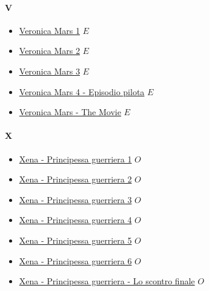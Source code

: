 	\paragraph{V} \hypertarget{SV}{}	
		\begin{itemize}
		
			\item \href{https://mega.nz/#F!h0xzjQQY!HF5rW8VjFddKlbV85LR5Yg} {Veronica Mars 1}  $E$ \\ 
			\item \href{https://mega.nz/#F!UxZl3KbQ!gHOo99pKktKo4-20Ym4Djw} {Veronica Mars 2}  $E$ \\ 
			\item \href{https://mega.nz/#F!5xBxxRbD!VHnMi9UjvSzCxnW9MX6Nzw} {Veronica Mars 3}  $E$ \\ 
			\item \href{https://mega.nz/#!EoZQVTxC!LJdq8idNVh443lA8si1ipOLa-zZ8GuZUdt5Qss3-SkE} {Veronica Mars 4 - Episodio pilota}  $E$ \\ 
			\item \href{https://mega.nz/#!FhIBVKpC!JjuePMFTE1-eFn8mc7C-sf3eRFCFvy4-M2_Ew1oAfFI} {Veronica Mars - The Movie}  $E$ \\ 
		
		
		\end{itemize}
	
	\paragraph{X} \hypertarget{SX}{}	
		\begin{itemize}
		
			\item \href{https://mega.nz/#F!174lSQrQ!-FZt2BBS2f_NYnM2O_TQHw} {Xena - Principessa guerriera 1}  $O$ \\ 
			\item \href{https://mega.nz/#F!oiJ3VK4Q!jM9H7Ba9I-Bn6dx-LhperA} {Xena - Principessa guerriera 2}  $O$ \\ 
			\item \href{https://mega.nz/#F!FuwTnZbK!Y4dKFIBfCj4cFfbGPnL04g} {Xena - Principessa guerriera 3}  $O$ \\ 
			\item \href{https://mega.nz/#F!Zuh3BBqQ!9kEZHQN7ew81UztjNQ3U7g} {Xena - Principessa guerriera 4}  $O$ \\ 
			\item \href{https://mega.nz/#F!Nigl0DxS!b4H8mVb0IYWbO03LTiu-Ng} {Xena - Principessa guerriera 5}  $O$ \\ 
			\item \href{https://mega.nz/#F!4rAAUJyZ!SgLb8fzDb32vNsAuezgL8A} {Xena - Principessa guerriera 6}  $O$ \\ 
			\item \href{https://mega.nz/#!VmgXBQCI!PXRr0T9tN76W3duME_gF8WGWjJuW5ke2UU1ggkb1H8M} {Xena - Principessa guerriera - Lo scontro finale}  $O$ \\ 
		
		
	\end{itemize}

